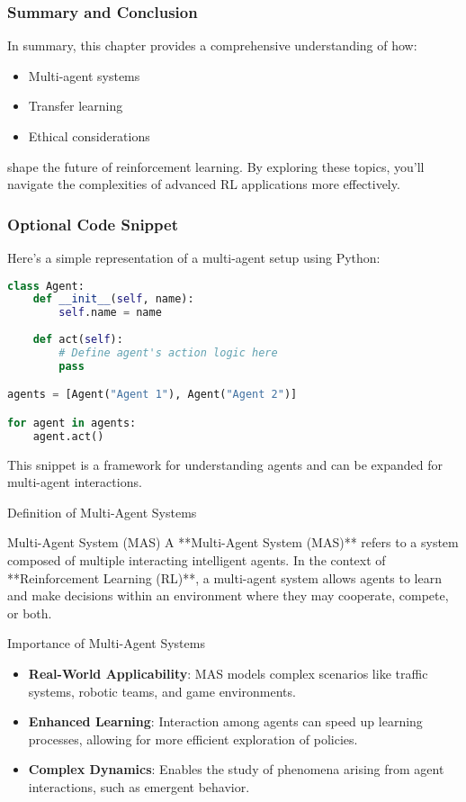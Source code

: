 \documentclass[aspectratio=169]{beamer}
\begin{document}
\begin{frame}[fragile]
    \frametitle{Summary and Conclusion}
    
    In summary, this chapter provides a comprehensive understanding of how:
    \begin{itemize}
        \item Multi-agent systems
        \item Transfer learning
        \item Ethical considerations 
    \end{itemize}
    shape the future of reinforcement learning. 
    By exploring these topics, you'll navigate the complexities of advanced RL applications more effectively.
\end{frame}

\begin{frame}[fragile]
    \frametitle{Optional Code Snippet}
    
    Here’s a simple representation of a multi-agent setup using Python:
    
    \begin{lstlisting}[language=Python]
class Agent:
    def __init__(self, name):
        self.name = name
    
    def act(self):
        # Define agent's action logic here
        pass

agents = [Agent("Agent 1"), Agent("Agent 2")]

for agent in agents:
    agent.act()
    \end{lstlisting}
    
    This snippet is a framework for understanding agents and can be expanded for multi-agent interactions.
\end{frame}

\begin{frame}[fragile]{Definition of Multi-Agent Systems}
    \begin{block}{Multi-Agent System (MAS)}
        A **Multi-Agent System (MAS)** refers to a system composed of multiple interacting intelligent agents. In the context of **Reinforcement Learning (RL)**, a multi-agent system allows agents to learn and make decisions within an environment where they may cooperate, compete, or both.
    \end{block}
\end{frame}

\begin{frame}[fragile]{Importance of Multi-Agent Systems}
    \begin{itemize}
        \item \textbf{Real-World Applicability}: MAS models complex scenarios like traffic systems, robotic teams, and game environments.
        \item \textbf{Enhanced Learning}: Interaction among agents can speed up learning processes, allowing for more efficient exploration of policies.
        \item \textbf{Complex Dynamics}: Enables the study of phenomena arising from agent interactions, such as emergent behavior.
    \end{itemize}
\end{frame}
\end{document}
